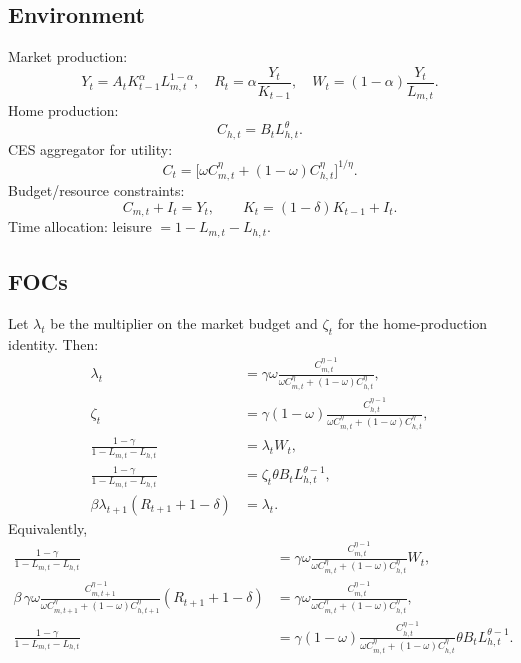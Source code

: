 \documentclass[a4paper,12pt]{article} %
\theoremstyle{nonitalic}
\begin{document}
\subsection{Environment}
Market production:
\begin{equation}
Y_t=A_t K_{t-1}^{\alpha} L_{m,t}^{1-\alpha},\quad 
R_t=\alpha \frac{Y_t}{K_{t-1}},\quad W_t=(1-\alpha)\frac{Y_t}{L_{m,t}}.
\end{equation}
Home production:
\begin{equation}
C_{h,t}=B_t L_{h,t}^{\theta}.
\end{equation}
CES aggregator for utility:
\begin{equation}
C_t=\Big[\omega C_{m,t}^{\eta}+(1-\omega)C_{h,t}^{\eta}\Big]^{1/\eta}.
\end{equation}
Budget/resource constraints:
\begin{equation}
C_{m,t}+I_t=Y_t,\qquad K_t=(1-\delta)K_{t-1}+I_t.
\end{equation}
Time allocation: leisure $=1-L_{m,t}-L_{h,t}$.

\subsection{FOCs}
Let $\lambda_t$ be the multiplier on the market budget and $\zeta_t$ for the home-production identity. Then:
\begin{align}
\lambda_t &= \gamma \omega \frac{C_{m,t}^{\eta-1}}{\omega C_{m,t}^{\eta}+(1-\omega)C_{h,t}^{\eta}},\\
\zeta_t &= \gamma (1-\omega) \frac{C_{h,t}^{\eta-1}}{\omega C_{m,t}^{\eta}+(1-\omega)C_{h,t}^{\eta}},\\
\frac{1-\gamma}{1-L_{m,t}-L_{h,t}} &= \lambda_t W_t,\\
\frac{1-\gamma}{1-L_{m,t}-L_{h,t}} &= \zeta_t \theta B_t L_{h,t}^{\theta-1},\\
\beta \lambda_{t+1}(R_{t+1}+1-\delta) &= \lambda_t.
\end{align}
Equivalently,
\begin{align}
\frac{1-\gamma}{1-L_{m,t}-L_{h,t}} 
&= \gamma \omega \frac{C_{m,t}^{\eta-1}}{\omega C_{m,t}^{\eta} + (1-\omega)C_{h,t}^{\eta}} W_t,\\
\beta\,\gamma \omega \frac{C_{m,t+1}^{\eta-1}}{\omega C_{m,t+1}^{\eta}+(1-\omega)C_{h,t+1}^{\eta}}(R_{t+1}+1-\delta)
&= \gamma \omega \frac{C_{m,t}^{\eta-1}}{\omega C_{m,t}^{\eta}+(1-\omega)C_{h,t}^{\eta}},\\
\frac{1-\gamma}{1-L_{m,t}-L_{h,t}}
&= \gamma (1-\omega) \frac{C_{h,t}^{\eta-1}}{\omega C_{m,t}^{\eta}+(1-\omega)C_{h,t}^{\eta}} \theta B_t L_{h,t}^{\theta-1}.
\end{align}
\end{document}
